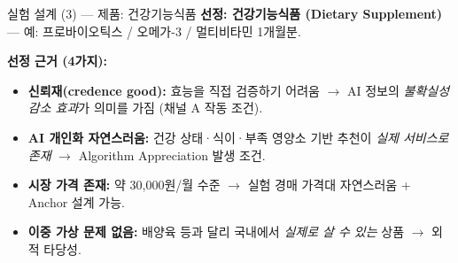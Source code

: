 \documentclass[aspectratio=169]{beamer}
\begin{document}
\begin{frame}{실험 설계 (3) --- 제품: 건강기능식품}
  \textbf{선정: 건강기능식품 (Dietary Supplement)} --- 예: 프로바이오틱스 / 오메가-3 / 멀티비타민 1개월분.

  \vspace{0.5em}
  \textbf{선정 근거 (4가지):}
  \begin{itemize}\itemsep0.2em
    \item \textbf{신뢰재(credence good):} 효능을 직접 검증하기 어려움 $\rightarrow$ AI 정보의 \emph{불확실성 감소 효과}가 의미를 가짐 (채널 A 작동 조건).
    \item \textbf{AI 개인화 자연스러움:} 건강 상태·식이·부족 영양소 기반 추천이 \emph{실제 서비스로 존재} $\rightarrow$ Algorithm Appreciation 발생 조건.
    \item \textbf{시장 가격 존재:} 약 30,000원/월 수준 $\rightarrow$ 실험 경매 가격대 자연스러움 + Anchor 설계 가능.
    \item \textbf{이중 가상 문제 없음:} 배양육 등과 달리 국내에서 \emph{실제로 살 수 있는} 상품 $\rightarrow$ 외적 타당성.
  \end{itemize}

  \vspace{0.3em}
\end{frame}
\end{document}
